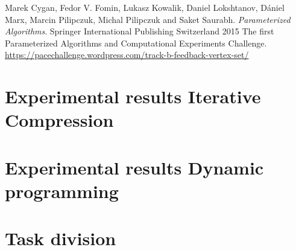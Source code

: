 \documentclass[a4paper,10pt]{article}
\begin{document}

\begin{thebibliography}{9}
 Marek Cygan, Fedor V. Fomin, Lukasz Kowalik, Daniel Lokshtanov, Dániel Marx, Marcin Pilipczuk, Michal Pilipczuk and Saket Saurabh. \textit{Parameterized Algorithms}. Springer International Publishing Switzerland 2015
 The first Parameterized Algorithms and Computational Experiments Challenge. \url{https://pacechallenge.wordpress.com/track-b-feedback-vertex-set/}
\end{thebibliography}

\clearpage
\appendix

\FloatBarrier
\section{Experimental results Iterative Compression} \label{app:itcomp}


\FloatBarrier
\section{Experimental results Dynamic programming} \label{app:dynamicprogram}


\FloatBarrier
\section{Task division}

\end{document}
